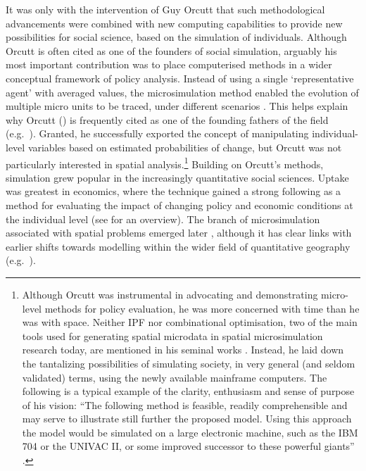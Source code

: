 It was only with the intervention of Guy Orcutt that such methodological
advancements were combined with new computing capabilities to provide new
possibilities for social science, based on the simulation of individuals.
Although Orcutt is often cited as one of the founders of social simulation,
arguably his most important contribution was to place computerised methods in a
wider conceptual framework of policy analysis. Instead of using a
single `representative agent' with averaged values, the microsimulation method
enabled the evolution of multiple micro units to be traced, under different
scenarios \citep[p.~176]{mitton2000microsimulation}.
This helps explain why Orcutt (\citeyear{Orcutt1957-new-type,
orcutt1961microanalysis}) is frequently cited as one of the founding fathers of
the field
(e.g.~\citealp{Clarke+Longley1989-UK-housing-sim,Wu2008,
Ballas2013-4policy-analysis}). Granted, he successfully exported the concept of
manipulating individual-level variables based on estimated
probabilities of change, but Orcutt was not particularly interested in
spatial analysis.\footnote{Although
Orcutt was instrumental in advocating and demonstrating
micro-level methods for policy evaluation, he was more concerned with time than
he was with
space. %
Neither IPF nor combinational optimisation, two of the main tools used for
generating spatial microdata in spatial microsimulation research today,
are mentioned in his seminal works
\citep{Orcutt1957-new-type,orcutt1961microanalysis}.
Instead, he laid down the tantalizing possibilities of simulating society, in
very general (and seldom validated) terms, using the newly available
mainframe computers. The following is a typical example of the clarity,
enthusiasm and sense of purpose of his vision: ``The following method is
feasible, readily comprehensible and may serve to illustrate still further the
proposed model. Using this approach the model would be simulated on a large
electronic machine, such as the IBM 704 or the UNIVAC II, or some improved
successor to these powerful giants'' \citep[p.~119]{Orcutt1957-new-type}.
}
Building on Orcutt's methods, simulation grew popular in the
increasingly quantitative social sciences. Uptake was
greatest in economics, where the technique
gained a strong following as a method for evaluating the impact of
changing policy and economic conditions at the individual level
(see \citealp{Merz1994} for an overview).
The branch of microsimulation associated with spatial problems emerged later
\citep{Tanton2013-intro}, although it has clear links with earlier shifts
towards modelling within the wider field of quantitative geography
(e.g.~\citealp{Clarke1985}).


